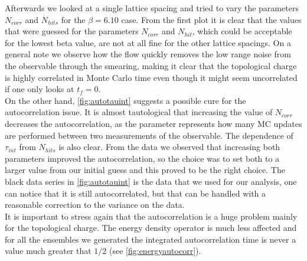 Afterwards we looked at a single lattice spacing and tried to vary the parameters $N_{corr}$ and $N_{hits}$ for the $\beta=6.10$ case. 
From the first plot it is clear that the values that were guessed for the parameters $N_{corr}$ and $N_{hit}$, which could be acceptable for the lowest beta value, are not at all fine for the other lattice spacings. On a general note we observe how the flow quickly removes the low range noise from the observable through the smearing, making it clear that the topological charge is highly correlated in Monte Carlo time even though it might seem uncorrelated if one only looks at $t_f = 0$. \\
On the other hand, \cref{fig:autotauint} suggests a possible cure for the autocorrelation issue. It is almost tautological that increasing the value of $N_{corr}$ decreases the autocorrelation, as the parameter represents how many MC updates are performed between two measurements of the observable. The dependence of $\tau_{int}$ from $N_{hits}$ is also clear. From the data we observed that increasing both parameters improved the autocorrelation, so the choice was to set both to a larger value from our initial guess and this proved to be the right choice. The black data series in  \cref{fig:autotauint} is the data that we used for our analysis, one can notice that it is still autocorrelated, but that can be handled with a reasonable correction to the variance on the data. \\
It is important to stress again that the autocorrelation is a huge problem mainly for the topological charge. The energy density operator is much less affected and for all the ensembles we generated the integrated autocorrelation time is never a value much greater that $1/2$ (see \cref{fig:energyautocorr}). 
 
